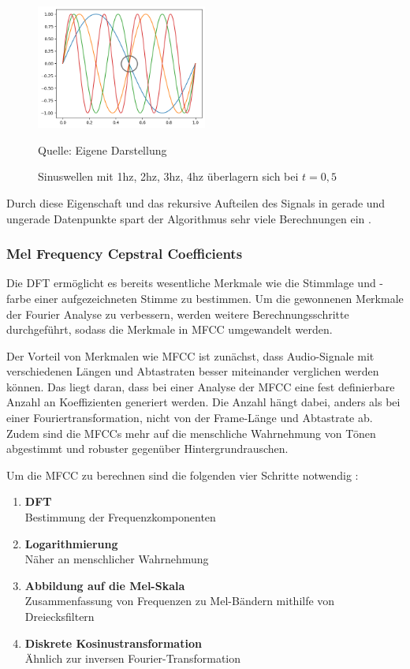 \begin{figure}
    \centering
    \includegraphics[width=0.5\textwidth]{images/fft-advantage.png}
    \caption{Sinuswellen mit 1hz, 2hz, 3hz, 4hz überlagern sich bei $t=0,5$}{Quelle: Eigene Darstellung}
    \label{fig:fft-advantage}
\end{figure}\noindent

Durch diese Eigenschaft und das rekursive Aufteilen des Signals in gerade und ungerade Datenpunkte spart der Algorithmus sehr viele Berechnungen ein \autocite[vgl.][S. 643]{oppenheim_discrete-time_1999}.

\subsubsection{Mel Frequency Cepstral Coefficients}

\textauthor{\vJB}{}{}

Die \ac{DFT} ermöglicht es bereits wesentliche Merkmale wie die Stimmlage und -farbe einer aufgezeichneten Stimme zu bestimmen.
Um die gewonnenen Merkmale der Fourier Analyse zu verbessern, werden weitere Berechnungsschritte durchgeführt, sodass die Merkmale in \ac{MFCC} umgewandelt werden.

Der Vorteil von Merkmalen wie \ac{MFCC} ist zunächst, dass Audio-Signale mit verschiedenen Längen und Abtastraten besser miteinander verglichen werden können.
Das liegt daran, dass bei einer Analyse der \ac{MFCC} eine fest definierbare Anzahl an Koeffizienten generiert werden.
Die Anzahl hängt dabei, anders als bei einer Fouriertransformation, nicht von der Frame-Länge und Abtastrate ab.
Zudem sind die \acp{MFCC} mehr auf die menschliche Wahrnehmung von Tönen abgestimmt und robuster gegenüber Hintergrundrauschen.

Um die \ac{MFCC} zu berechnen sind die folgenden vier Schritte notwendig \autocite[vgl. ][S. 2]{logan_mel_2000}:

\begin{enumerate}
    \item \textbf{\ac{DFT}}\\Bestimmung der Frequenzkomponenten
    \item \textbf{Logarithmierung}\\Näher an menschlicher Wahrnehmung
    \item \textbf{Abbildung auf die Mel-Skala}\\Zusammenfassung von Frequenzen zu Mel-Bändern mithilfe von Dreiecksfiltern
    \item \textbf{Diskrete Kosinustransformation}\\Ähnlich zur inversen Fourier-Transformation
\end{enumerate}

